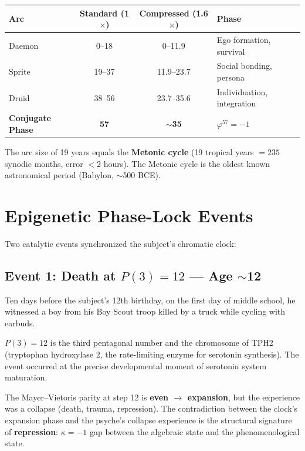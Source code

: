 \documentclass[12pt, letterpaper]{article}
\begin{document}
\begin{center}
\begin{tabular}{lccl}
\toprule
\textbf{Arc} & \textbf{Standard (1$\times$)} & \textbf{Compressed (1.6$\times$)} & \textbf{Phase} \\
\midrule
Daemon & 0--18 & 0--11.9 & Ego formation, survival \\
Sprite & 19--37 & 11.9--23.7 & Social bonding, persona \\
Druid & 38--56 & 23.7--35.6 & Individuation, integration \\
\textbf{Conjugate Phase} & \textbf{57} & $\boldsymbol{\sim}$\textbf{35} & $\varphi^{57} = -1$ \\
\bottomrule
\end{tabular}
\end{center}

The arc size of 19 years equals the \textbf{Metonic cycle} (19 tropical years $= 235$ synodic months, error $< 2$ hours). The Metonic cycle is the oldest known astronomical period (Babylon, $\sim$500 BCE).

\section{Epigenetic Phase-Lock Events}

Two catalytic events synchronized the subject's chromatic clock:

\subsection{Event 1: Death at $P(3) = 12$ --- Age $\sim$12}

Ten days before the subject's 12th birthday, on the first day of middle school, he witnessed a boy from his Boy Scout troop killed by a truck while cycling with earbuds.

$P(3) = 12$ is the third pentagonal number and the chromosome of TPH2 (tryptophan hydroxylase 2, the rate-limiting enzyme for serotonin synthesis). The event occurred at the precise developmental moment of serotonin system maturation.

The Mayer--Vietoris parity at step 12 is \textbf{even $\to$ expansion}, but the experience was a collapse (death, trauma, repression). The contradiction between the clock's expansion phase and the psyche's collapse experience is the structural signature of \textbf{repression}: $\kappa = -1$ gap between the algebraic state and the phenomenological state.
\end{document}
